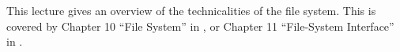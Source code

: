 This lecture gives an overview of the technicalities of the file system.
This is covered by Chapter 10 ``File System'' in \cite{Silberschatz2009osc}, or 
Chapter 11 ``File-System Interface'' in 
\cite{Silberschatz2013osc,Silberschatz2013intl}.
